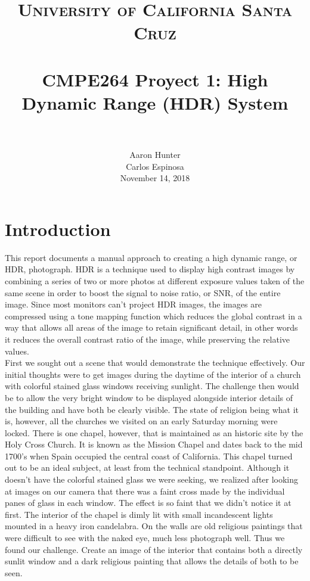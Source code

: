 \documentclass[a4paper]{article}
\title{
		\vspace{-0.6in} 	
		\usefont{OT1}{bch}{b}{n}
		\normalfont \normalsize \textsc{University of California Santa Cruz} \\ [10pt]
		\horrule{0.5pt} \\[0.4cm]
		\huge CMPE264 Proyect 1: High Dynamic Range (HDR) System \\
		\horrule{2pt} \\[0.5cm]
}
\author{
		\normalfont 								
        Aaron Hunter\\  Carlos Espinosa\\[-3pt]		\normalsize
        November 14, 2018
}
\date{}
\begin{document}
\maketitle
\section*{Introduction}
This report documents a manual approach to creating a high dynamic range, or HDR, photograph.  HDR is a technique used to display  high contrast images by combining a series of two or more photos  at different exposure values taken of the same scene in order to boost the signal to noise ratio, or SNR, of the entire image.  Since most monitors can't project HDR images, the images are compressed using a tone mapping function which reduces the global contrast in a way that allows all areas of the image to retain significant detail, in other words it reduces the overall contrast ratio of the image, while preserving the relative values. \\

First we sought out a scene that would demonstrate the technique effectively.  Our initial thoughts were to get images during the daytime of the interior of a church with colorful stained glass windows receiving sunlight.  The challenge then would be to allow the very bright window to be displayed alongside interior details of the building and have both be clearly visible.  The state of religion being what it is, however, all the churches we visited on an early Saturday morning were locked.  There is one chapel, however, that is maintained as an historic site by the Holy Cross Church.  It is known as the Mission Chapel and dates back to the mid 1700's when Spain occupied the central coast of California.  This chapel turned out to be an ideal subject, at least from the technical standpoint.  Although it doesn't have the colorful stained glass we were seeking, we realized after looking at images on our camera that there was a faint cross made by the individual panes of glass in each window.  The effect is so faint that we didn't notice it at first.  The interior of the chapel is dimly lit with small incandescent lights mounted in a heavy iron candelabra. On the walls are old religious paintings that were difficult to see with the naked eye, much less photograph well.  Thus we found our challenge.  Create an image of the interior that contains both a directly sunlit window and a dark religious painting that allows the details of both to be seen. 
\end{document}
